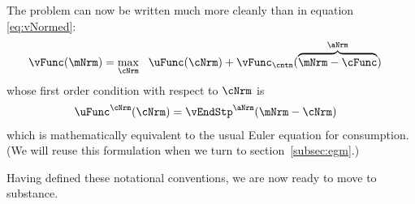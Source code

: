 The {\Decision} problem can now be written much more cleanly than in equation \eqref{eq:vNormed}:
  \begin{equation}\begin{gathered}\begin{aligned}
        \vFunc(\mNrm) & = \max_{\cNrm}~~\uFunc({\cNrm}) +\vFunc_{\cntn}(\overbrace{\mNrm-\cFunc}^{\aNrm}) \label{eq:vMid}
      \end{aligned}\end{gathered}\end{equation}
whose first order condition with respect to $\cNrm$ is
\begin{equation}\begin{gathered}\begin{aligned}
  \uFunc^{\cNrm}(\cNrm) &= \vEndStp^{\aNrm}(\mNrm-\cNrm)  \label{eq:upEqbetaOp} 
\end{aligned}\end{gathered}\end{equation}
which is mathematically equivalent to the usual Euler equation for consumption.  (We will reuse this formulation when we turn to section~\ref{subsec:egm}.)

Having defined these notational conventions, we are now ready to move to substance.

